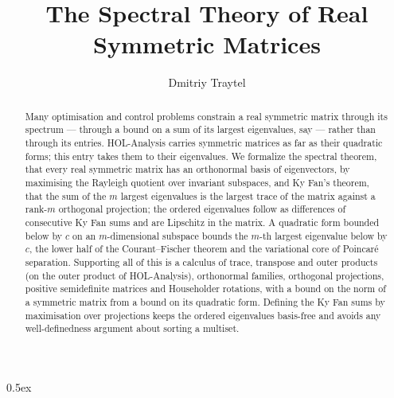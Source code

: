 \documentclass[11pt,a4paper]{article}
\begin{document}
\title{The Spectral Theory of Real Symmetric Matrices}
\author{Dmitriy Traytel}
\maketitle

\begin{abstract}
  Many optimisation and control problems constrain a real symmetric matrix
  through its spectrum --- through a bound on a sum of its largest
  eigenvalues, say --- rather than through its entries.  HOL-Analysis carries
  symmetric matrices as far as their quadratic forms; this entry takes them
  to their eigenvalues.  We formalize the spectral theorem, that every real
  symmetric matrix has an orthonormal basis of eigenvectors, by maximising
  the Rayleigh quotient over invariant subspaces, and Ky Fan's theorem, that
  the sum of the $m$ largest eigenvalues is the largest trace of the matrix
  against a rank-$m$ orthogonal projection; the ordered eigenvalues follow as
  differences of consecutive Ky Fan sums and are Lipschitz in the matrix.
  A quadratic form bounded below by $c$ on an $m$-dimensional
  subspace bounds the $m$-th largest eigenvalue below by $c$, the lower half
  of the Courant--Fischer theorem and the variational core of Poincar\'e
  separation.  Supporting all of this is a calculus of
  trace, transpose and outer products (on the outer product of HOL-Analysis),
  orthonormal families, orthogonal projections, positive semidefinite
  matrices and Householder rotations, with a bound on the norm of a
  symmetric matrix from a bound on its quadratic form.  Defining
  the Ky Fan sums by maximisation over projections keeps the ordered
  eigenvalues basis-free and avoids any well-definedness argument about
  sorting a multiset.
\end{abstract}

\tableofcontents

\parindent 0pt\parskip 0.5ex





\end{document}
